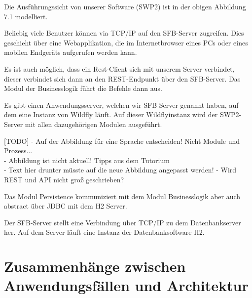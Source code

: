 \documentclass[enabledeprecatedfontcommands,fontsize=12pt,paper=a4,twoside]{scrartcl}
\begin{document}
{ Die Ausführungssicht von unserer Software (SWP2) ist in der obigen Abbildung
  7.1 modelliert.

Beliebig viele Benutzer können via TCP/IP auf den SFB-Server zugreifen. Dies
geschieht über eine Webapplikation, die im Internetbrowser eines PCs oder eines
mobilen Endgeräts aufgerufen werden kann.

Es ist auch möglich, dass ein Rest-Client sich mit unserem Server verbindet,
dieser verbindet sich dann an den REST-Endpunkt über den SFB-Server. Das Modul
der Businesslogik führt die Befehle dann aus.

Es gibt einen Anwendungsserver, welchen wir SFB-Server genannt haben, auf dem
eine Instanz von Wildfly läuft. Auf dieser Wildflyinstanz wird der SWP2-Server
mit allen dazugehörigen Modulen ausgeführt.

[TODO] 
- Auf der Abbildung für eine Sprache entscheiden! Nicht Module und Prozess...\\
- Abbildung ist nicht aktuell! Tipps aus dem Tutorium\\
- Text hier drunter müsste auf die neue Abbildung angepasst werden!
- Wird REST und API nicht groß geschrieben?

Das Modul Persistence kommuniziert mit dem Modul Businesslogik aber auch
\glqq abstract\grqq{} über JDBC mit dem H2 Server.

Der SFB-Server stellt eine Verbindung über TCP/IP zu dem
Datenbankserver her. Auf dem Server läuft eine Instanz der Datenbanksoftware H2.
}



\section[Zusammenhänge zwischen Anwendungsfällen und Architektur]{Zusammenhänge zwischen Anwendungsfällen und Architektur}
\label{sec:anwendungsfaelle}
\end{document}
